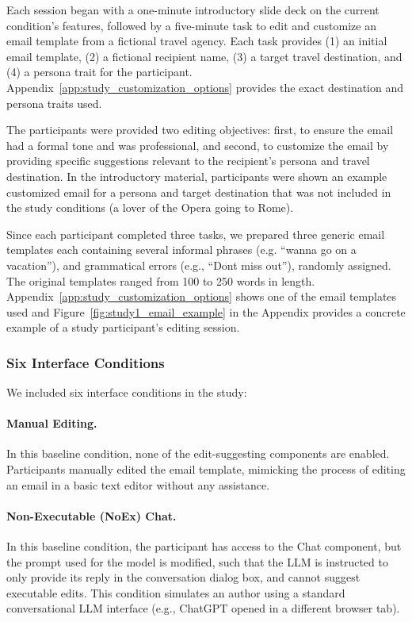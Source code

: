 \documentclass[manuscript]{acmart}
\begin{document}
Each session began with a one-minute introductory slide deck on the current condition's features, followed by a five-minute task to edit and customize an email template from a fictional travel agency. Each task provides (1) an initial email template, (2) a fictional recipient name, (3) a target travel destination, and (4) a persona trait for the participant. Appendix~\ref{app:study_customization_options} provides the exact destination and persona traits used. 

The participants were provided two editing objectives: first, to ensure the email had a formal tone and was professional, and second, to customize the email by providing specific suggestions relevant to the recipient's persona and travel destination. In the introductory material, participants were shown an example customized email for a persona and target destination that was not included in the study conditions (a lover of the Opera going to Rome).

Since each participant completed three tasks, we prepared three generic email templates each containing several informal phrases (e.g. ``wanna go on a vacation''), and grammatical errors (e.g., ``Dont miss out''), randomly assigned. The original templates ranged from 100 to 250 words in length. Appendix~\ref{app:study_customization_options} shows one of the email templates used and Figure~\ref{fig:study1_email_example} in the Appendix provides a concrete example of a study participant's editing session.

\subsubsection{Six Interface Conditions}

We included six interface conditions in the study:

\paragraph{Manual Editing.} In this baseline condition, none of the edit-suggesting components are enabled. Participants manually edited the email template, mimicking the process of editing an email in a basic text editor without any assistance.

\paragraph{Non-Executable (NoEx) Chat.} In this baseline condition, the participant has access to the Chat component, but the prompt used for the model is modified, such that the LLM is instructed to only provide its reply in the conversation dialog box, and cannot suggest executable edits. This condition simulates an author using a standard conversational LLM interface (e.g., ChatGPT opened in a different browser tab).
\end{document}
